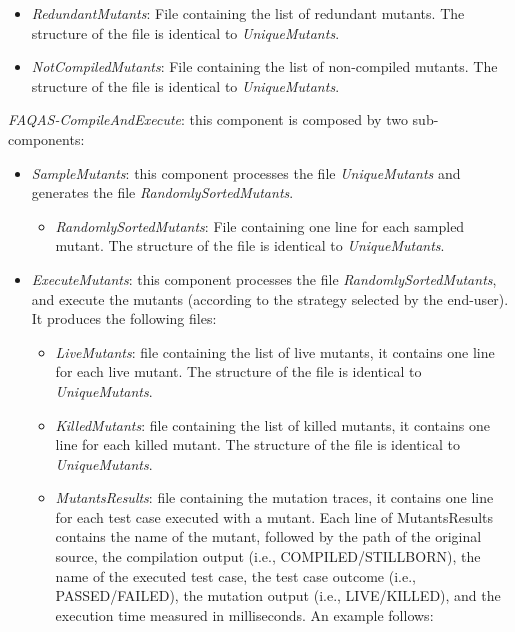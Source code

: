 \begin{itemize}
{\begin{itemize}
		\item \textit{RedundantMutants}: File containing the list of redundant mutants. The structure of the file is identical to \textit{UniqueMutants}.
		
		\item \textit{NotCompiledMutants}: File containing the list of non-compiled mutants. The structure of the file is identical to \textit{UniqueMutants}.
	\end{itemize}
	\item \textit{FAQAS-CompileAndExecute}: this component is composed by two sub-components:
		\begin{itemize}
			\item \textit{SampleMutants}: this component processes the file \textit{UniqueMutants} and generates the file \textit{RandomlySortedMutants}.

			\begin{itemize}
				\item \textit{RandomlySortedMutants}: File containing one line for each sampled mutant. The structure of the file is identical to \textit{UniqueMutants}.
			\end{itemize}
			\item \textit{ExecuteMutants}: this component processes the file \textit{RandomlySortedMutants}, and execute the mutants (according to the strategy selected by the end-user). It produces the following files:
			\begin{itemize}
				\item \textit{LiveMutants}: file containing the list of live mutants, it contains one line for each live mutant. The structure of the file is identical to \textit{UniqueMutants}.
				
				\item \textit{KilledMutants}: file containing the list of killed mutants, it contains one line for each killed mutant. The structure of the file is identical to \textit{UniqueMutants}.
				
				\item \textit{MutantsResults}: file containing the mutation traces, it contains one line for each test case executed with a mutant. Each line of MutantsResults contains the name of the mutant, followed by the path of the original source, the compilation output (i.e., COMPILED/STILLBORN), the name of the executed test case, the test case outcome (i.e., PASSED/FAILED), the mutation output (i.e., LIVE/KILLED), and the execution time measured in milliseconds. An example follows:


\end{itemize}
\end{itemize}}
\end{itemize}
